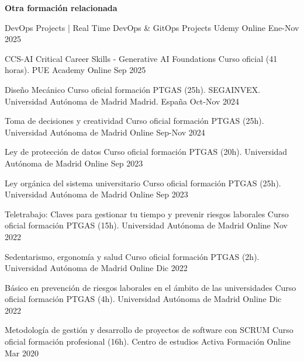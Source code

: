 \textbf{Otra formación relacionada}
\begin{cvhonors}	
   \cvhonor
	{DevOps Projects | Real Time DevOps \& GitOps Projects} %
	{Udemy} %
	{Online} %
	{Ene-Nov 2025} %

   \cvhonor
	{CCS-AI Critical Career Skills - Generative AI Foundations} %
	{Curso oficial (41 horas). PUE Academy} %
	{Online} %
	{Sep 2025} %

  \cvhonor
	{Diseño Mecánico} %
	{Curso oficial formación PTGAS (25h). SEGAINVEX. Universidad Autónoma de Madrid} %
	{Madrid. España} %
	{Oct-Nov 2024} %
    
   \cvhonor
	{Toma de decisiones y creatividad} %
	{Curso oficial formación PTGAS (25h). Universidad Autónoma de Madrid} %
	{Online} %
	{Sep-Nov 2024} %
	
   \cvhonor
	{Ley de protección de datos} %
	{Curso oficial formación PTGAS (20h). Universidad Autónoma de Madrid} %
	{Online} %
	{Sep 2023} %
	
   \cvhonor
	{Ley orgánica del sistema universitario} %
	{Curso oficial formación PTGAS (25h). Universidad Autónoma de Madrid} %
	{Online} %
	{Sep 2023} %

   \cvhonor
	{Teletrabajo: Claves para gestionar tu tiempo y prevenir riesgos laborales} %
	{Curso oficial formación PTGAS (15h). Universidad Autónoma de Madrid} %
	{Online} %
	{Nov 2022} %
	
   \cvhonor
	{Sedentarismo, ergonomía y salud} %
	{Curso oficial formación PTGAS (2h). Universidad Autónoma de Madrid} %
	{Online} %
	{Dic 2022} %

   \cvhonor
	{Básico en prevención de riesgos laborales en el ámbito de las universidades} %
	{Curso oficial formación PTGAS (4h). Universidad Autónoma de Madrid} %
	{Online} %
	{Dic 2022} %

   \cvhonor
	{Metodología de gestión y desarrollo de proyectos de software con SCRUM} %
	{Curso oficial formación profesional (16h). Centro de estudios Activa Formación} %
	{Online} %
	{Mar 2020} %


\end{cvhonors}
